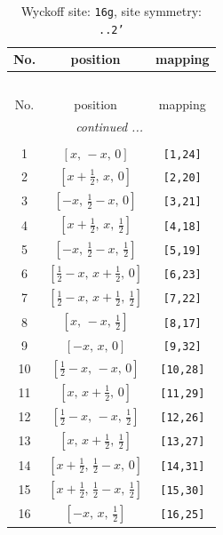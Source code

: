 \documentclass[fleqn,8pt]{jsarticle}
\begin{document}
\begin{longtable}{ccc}
\caption{Wyckoff site: {\tt 16g}, site symmetry: {\tt ..2'}}
 \\
 \hline \hline
No. & position & mapping \\ \hline \endfirsthead

\multicolumn{2}{l}{\tablename\ \thetable{}} \\
 \hline \hline
No. & position & mapping \\ \hline \endhead

 \hline \hline
\multicolumn{2}{r}{\footnotesize\it continued ...} \\ \endfoot

 \hline \hline
\multicolumn{2}{r}{} \\ \endlastfoot

1 & $\left[ x,\, - x,\, 0 \right]$ & {\tt [1,24]} \\ \hline
2 & $\left[ x + \frac{1}{2},\, x,\, 0 \right]$ & {\tt [2,20]} \\ \hline
3 & $\left[ - x,\, \frac{1}{2} - x,\, 0 \right]$ & {\tt [3,21]} \\ \hline
4 & $\left[ x + \frac{1}{2},\, x,\, \frac{1}{2} \right]$ & {\tt [4,18]} \\ \hline
5 & $\left[ - x,\, \frac{1}{2} - x,\, \frac{1}{2} \right]$ & {\tt [5,19]} \\ \hline
6 & $\left[ \frac{1}{2} - x,\, x + \frac{1}{2},\, 0 \right]$ & {\tt [6,23]} \\ \hline
7 & $\left[ \frac{1}{2} - x,\, x + \frac{1}{2},\, \frac{1}{2} \right]$ & {\tt [7,22]} \\ \hline
8 & $\left[ x,\, - x,\, \frac{1}{2} \right]$ & {\tt [8,17]} \\ \hline
9 & $\left[ - x,\, x,\, 0 \right]$ & {\tt [9,32]} \\ \hline
10 & $\left[ \frac{1}{2} - x,\, - x,\, 0 \right]$ & {\tt [10,28]} \\ \hline
11 & $\left[ x,\, x + \frac{1}{2},\, 0 \right]$ & {\tt [11,29]} \\ \hline
12 & $\left[ \frac{1}{2} - x,\, - x,\, \frac{1}{2} \right]$ & {\tt [12,26]} \\ \hline
13 & $\left[ x,\, x + \frac{1}{2},\, \frac{1}{2} \right]$ & {\tt [13,27]} \\ \hline
14 & $\left[ x + \frac{1}{2},\, \frac{1}{2} - x,\, 0 \right]$ & {\tt [14,31]} \\ \hline
15 & $\left[ x + \frac{1}{2},\, \frac{1}{2} - x,\, \frac{1}{2} \right]$ & {\tt [15,30]} \\ \hline
16 & $\left[ - x,\, x,\, \frac{1}{2} \right]$ & {\tt [16,25]} \\
\end{longtable}
\end{document}
